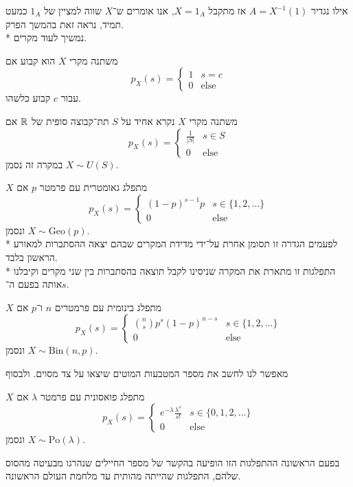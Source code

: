 אילו נגדיר $A = X^{-1}(1)$ אז מתקבל $X = 1_A$, אנו אומרים ש־$X$ שווה למציין של $1_A$ כמעט תמיד, נראה זאת בהמשך הפרק. \\*
נמשיך לעוד מקרים.
\begin{definition}
	משתנה מקרי $X$ הוא קבוע אם
	\[
		p_X(s) = \begin{cases}
			1 & s = c \\
			0 & \text{else}
		\end{cases}
	\]
	עבור $c$ קבוע כלשהו.
\end{definition}
\begin{definition}
	משתנה מקרי $X$ נקרא אחיד על $S$ תת־קבוצה סופית של $\mathbb{R}$ אם
	\[
		p_X(s) = \begin{cases}
			\frac{1}{|S|} & s \in S \\
			0 & \text{else}
		\end{cases}
	\]
	במקרה זה נסמן $X \sim U(S)$.
\end{definition}
\begin{definition}\label{geometric_distribution}
	$X$ מתפלג גאומטרית עם פרמטר $p$ אם
	\[
		p_X(s) = \begin{cases}
			{(1 - p)}^{s - 1} p & s \in \{1, 2, \dots \} \\
			0 & \text{else}
		\end{cases}
	\]
	ונסמן $X \sim \text{Geo}(p)$. \\*
	לפעמים הגדרה זו תסומן אחרת על־ידי מדידת המקרים שבהם יצאה ההסתברות למאורע הראשון בלבד. \\*
	התפלגות זו מתארת את המקרה שניסינו לקבל תוצאה בהסתברות בין שני מקרים וקיבלנו אותה בפעם ה־$s$.
\end{definition}
\begin{definition}\label{binominal_distribution}
	$X$ מתפלג בינומית עם פרמטרים $n$ ו־$p$ אם
	\[
		p_X(s) = \begin{cases}
			\binom{n}{s} p^s {(1 - p)}^{n - s} & s \in \{1, 2, \dots\} \\
			0 & \text{else}
		\end{cases}
	\]
	ונסמן $X \sim \text{Bin}(n, p)$.
\end{definition}
מאפשר לנו לחשב את מספר המטבעות המוטים שיצאו על צד מסוים.
ולבסוף
\begin{definition}\label{poasson_distribution}
	$X$ מתפלג פואסונית עם פרמטר $\lambda$ אם
	\[
		p_X(s) = \begin{cases}
			e^{-\lambda} \frac{\lambda^s}{s!} & s \in \{0, 1, 2, \dots\} \\
			0 & \text{else}
		\end{cases}
	\]
	ונסמן $X \sim \text{Po}(\lambda)$.
\end{definition}
בפעם הראשונה ההתפלגות הזו הופיעה בהקשר של מספר החיילים שנהרגו מבעיטה מהסוס שלהם, התפלגות שהייתה מהותית עד מלחמת העולם הראשונה.

